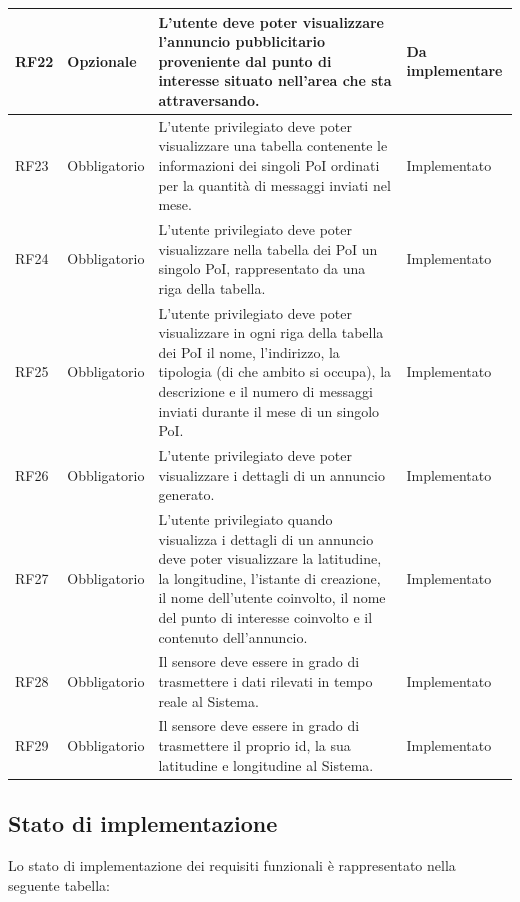 \documentclass[10pt]{article}
\begin{document}
\begin{longtable}{|>{\centering\arraybackslash}m{2.7cm}|>{\centering\arraybackslash}m{2.7cm}|>{\raggedright\arraybackslash}m{6cm}|>{\centering\arraybackslash}m{2.1cm}|}
    \hline
    RF22 & Opzionale & L'utente deve poter visualizzare l'annuncio pubblicitario proveniente dal punto di interesse situato nell'area che sta attraversando. & Da implementare \\
    \hline
    RF23 & Obbligatorio & L'utente privilegiato deve poter visualizzare una tabella contenente le informazioni dei singoli PoI ordinati per la quantità di messaggi inviati nel mese. & Implementato \\
    \hline
    RF24 & Obbligatorio & L'utente privilegiato deve poter visualizzare nella tabella dei PoI un singolo PoI, rappresentato da una riga della tabella. & Implementato \\
    \hline
    RF25 & Obbligatorio & L'utente privilegiato deve poter visualizzare in ogni riga della tabella dei PoI il nome, l'indirizzo, la tipologia (di che ambito si occupa), la descrizione e il numero di messaggi inviati durante il mese di un singolo PoI. & Implementato \\
    \hline
    RF26 & Obbligatorio & L'utente privilegiato deve poter visualizzare i dettagli di un annuncio generato. & Implementato \\
    \hline
    RF27 & Obbligatorio & L'utente privilegiato quando visualizza i dettagli di un annuncio deve poter visualizzare la latitudine, la longitudine, l'istante di creazione, il nome dell'utente coinvolto, il nome del punto di interesse coinvolto e il contenuto dell'annuncio. & Implementato \\
    \hline
    RF28 & Obbligatorio & Il sensore deve essere in grado di trasmettere i dati rilevati in tempo reale al Sistema. & Implementato \\
    \hline
    RF29 & Obbligatorio & Il sensore deve essere in grado di trasmettere il proprio id, la sua latitudine e longitudine al Sistema. & Implementato \\
    \hline
\end{longtable}

\subsection{Stato di implementazione}

Lo stato di implementazione dei requisiti funzionali è rappresentato nella seguente tabella:
\end{document}
